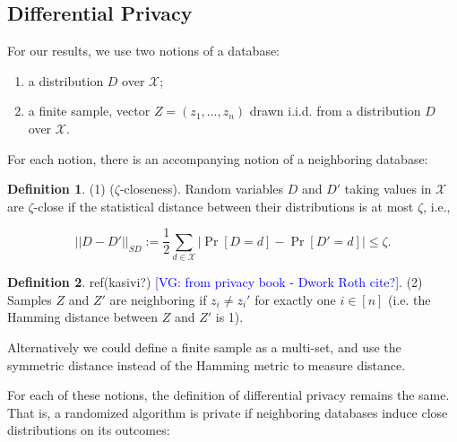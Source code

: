 \documentclass[format = sigconf]{acmart}
\newcommand{\vg}[1]{\textcolor{blue}{[VG: #1]}}
\newcommand{\X}{\mathcal{X}}
\newcommand{\1}{\mathbbm{1}}
\newcommand{\zt}{\zeta}
\newcommand{\zya}{Z_{ya}}
\theoremstyle{definition}
\newtheorem{defn}{Definition}[section]
\begin{document}

\subsection{Differential Privacy}
For our results, we use two notions of a database: 
\begin{enumerate}
	\item a distribution $D$ over $\X$;
	\item a finite sample, vector $Z = (z_1, ..., z_n)$ drawn i.i.d. from a distribution $D$ over $\X$.
\end{enumerate}
For each notion, there is an accompanying notion of a neighboring database:
\begin{defn}
	(1) ($\zt$-closeness). Random variables $D$ and $D'$ taking values in $\X$ are $\zt$-close if the statistical distance between their distributions is at most $\zt$, i.e.,

	$$ ||D-D'||_{\textit{SD}} :=\frac{1}{2}\sum_{d\in \mathcal{X}} |\Pr[D=d] - \Pr[D'=d]| \leq \zeta.$$
\end{defn}

\begin{defn} ref(kasivi?) \vg{from privacy book - Dwork Roth cite?}.
(2) Samples $Z$ and $Z'$ are neighboring if $z_i \neq z_i'$ for exactly one $i \in [n]$ (i.e. the Hamming distance between $Z$ and $Z'$ is 1).
\end{defn}
Alternatively we could define a finite sample as a multi-set, and use the symmetric distance instead of the Hamming metric to measure distance. 

For each of these notions, the definition of differential privacy remains the same. That is, a randomized algorithm is private if neighboring databases induce close distributions on its outcomes:
\end{document}
